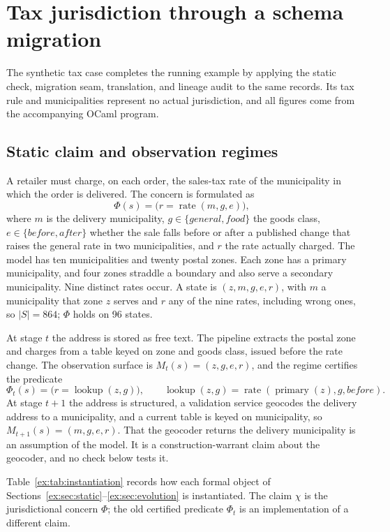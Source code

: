 \documentclass[smallextended,envcountsect,envcountsame,natbib]{svjour3}
\begin{document}
\section{Tax jurisdiction through a schema migration}\label{ex:sec:case}

The synthetic tax case completes the running example by applying the static check, migration seam, translation, and lineage audit to the same records. Its tax rule and municipalities represent no actual jurisdiction, and all figures come from the accompanying OCaml program.

\subsection{Static claim and observation regimes}

A retailer must charge, on each order, the sales-tax rate of the municipality in which the order is delivered. The concern is formulated as
\[
\Phi(s)=\bigl(r=\operatorname{rate}(m,g,e)\bigr),
\]
where $m$ is the delivery municipality, $g \in \{\mathit{general},\mathit{food}\}$ the goods class, $e \in \{\mathit{before},\mathit{after}\}$ whether the sale falls before or after a published change that raises the general rate in two municipalities, and $r$ the rate actually charged. The model has ten municipalities and twenty postal zones. Each zone has a primary municipality, and four zones straddle a boundary and also serve a secondary municipality. Nine distinct rates occur. A state is $(z,m,g,e,r)$, with $m$ a municipality that zone $z$ serves and $r$ any of the nine rates, including wrong ones, so $|S|=864$; $\Phi$ holds on 96 states.

At stage $t$ the address is stored as free text. The pipeline extracts the postal zone and charges from a table keyed on zone and goods class, issued before the rate change. The observation surface is $M_t(s)=(z,g,e,r)$, and the regime certifies the predicate
\[
\Phi_t(s)=\bigl(r=\operatorname{lookup}(z,g)\bigr),
\qquad
\operatorname{lookup}(z,g)=\operatorname{rate}(\operatorname{primary}(z),g,\mathit{before}).
\]
At stage $t+1$ the address is structured, a validation service geocodes the delivery address to a municipality, and a current table is keyed on municipality, so $M_{t+1}(s)=(m,g,e,r)$. That the geocoder returns the delivery municipality is an assumption of the model. It is a construction-warrant claim about the geocoder, and no check below tests it.

Table~\ref{ex:tab:instantiation} records how each formal object of Sections~\ref{ex:sec:static}--\ref{ex:sec:evolution} is instantiated. The claim $\chi$ is the jurisdictional concern $\Phi$; the old certified predicate $\Phi_t$ is an implementation of a different claim.
\end{document}

